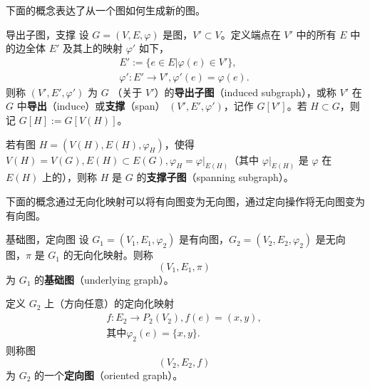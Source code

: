 下面的概念表达了从一个图如何生成新的图。

\begin{definition}{导出子图，支撑}
设 $G=(V,E,\varphi)$ 是图，$V'\subset V$。定义端点在 $V'$ 中的所有 $E$ 中的边全体 $E'$ 及其上的映射 $\varphi'$ 如下，
\begin{equation}
\begin{aligned}
E':=\{e\in E|\varphi(e)\in V'\},\\
\varphi':E'\rightarrow V',\varphi'(e)=\varphi(e).
\end{aligned}~
\end{equation}
则称 $(V',E',\varphi')$ 为 $G$ （关于 $V'$）的\textbf{导出子图}（induced subgraph），或称 $V'$ 在 $G$ 中\textbf{导出}（induce）或\textbf{支撑}（span） $(V',E',\varphi')$，记作 $G[V']$。若 $H\subset G$，则记 $G[H]:=G[V(H)]$。

若有图 $H=(V(H),E(H),\varphi_H)$，使得 $V(H)=V(G),E(H)\subset E(G),\varphi_H=\varphi|_{E(H)}$（其中 $\varphi|_{E(H)}$ 是 $\varphi$ 在 $E(H)$ 上的），则称 $H$ 是 $G$ 的\textbf{支撑子图}（spanning subgraph）。
\end{definition}

下面的概念通过无向化映射可以将有向图变为无向图，通过定向操作将无向图变为有向图。

\begin{definition}{基础图，定向图}
设 $G_1=(V_1,E_1,\varphi_2)$ 是有向图，$G_2=(V_2,E_2,\varphi_2)$ 是无向图，$\pi$ 是 $G_1$ 的无向化映射。则称
\begin{equation}
(V_1,E_1,\pi)~
\end{equation}
为 $G_1$ 的\textbf{基础图}（underlying graph）。

定义 $G_2$ 上（方向任意）的定向化映射
\begin{equation}
\begin{aligned}
f:E_2\rightarrow P_2(V_2),f(e)=(x,y),\\
\text{其中} \varphi_2(e)=\{x,y\}.
\end{aligned}~
\end{equation}
则称图
\begin{equation}
(V_2,E_2,f)~
\end{equation}
为 $G_2$ 的一个\textbf{定向图}（oriented graph）。
\end{definition}





